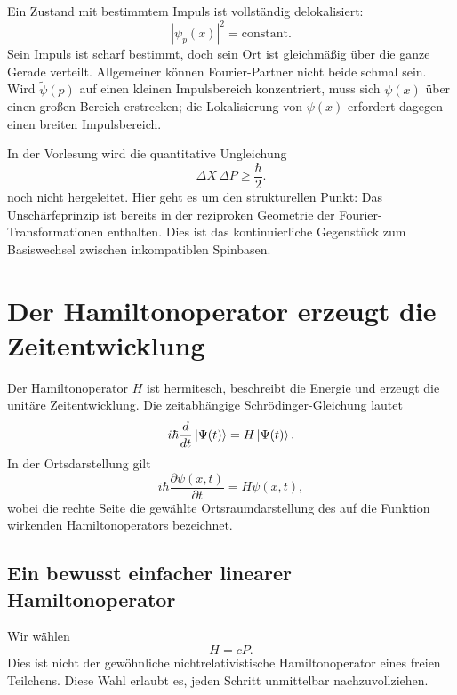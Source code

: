 Ein Zustand mit bestimmtem Impuls ist vollständig delokalisiert:
\begin{equation}
|\psi_p(x)|^2=\text{constant}.
\end{equation}
Sein Impuls ist scharf bestimmt, doch sein Ort ist gleichmäßig über die ganze Gerade verteilt. Allgemeiner können Fourier-Partner nicht beide schmal sein. Wird \(\widetilde{\psi}(p)\) auf einen kleinen Impulsbereich konzentriert, muss sich \(\psi(x)\) über einen großen Bereich erstrecken; die Lokalisierung von \(\psi(x)\) erfordert dagegen einen breiten Impulsbereich.

In der Vorlesung wird die quantitative Ungleichung
\begin{equation}
\Delta X\,\Delta P\geq\frac{\hbar}{2}.
\end{equation}
noch nicht hergeleitet. Hier geht es um den strukturellen Punkt: Das Unschärfeprinzip ist bereits in der reziproken Geometrie der Fourier-Transformationen enthalten. Dies ist das kontinuierliche Gegenstück zum Basiswechsel zwischen inkompatiblen Spinbasen.

\section{Der Hamiltonoperator erzeugt die Zeitentwicklung}

Der Hamiltonoperator \(H\) ist hermitesch, beschreibt die Energie und erzeugt die unitäre Zeitentwicklung. Die zeitabhängige Schr\"odinger-Gleichung lautet
\begin{equation}
i\hbar\frac{d}{dt}\left\lvert\Psi(t)\right\rangle
=
H\left\lvert\Psi(t)\right\rangle.
\label{eq:l9-abstract-schrodinger}
\end{equation}
In der Ortsdarstellung gilt
\begin{equation}
i\hbar\frac{\partial\psi(x,t)}{\partial t}
=
H\psi(x,t),
\label{eq:l9-position-schrodinger}
\end{equation}
wobei die rechte Seite die gewählte Ortsraumdarstellung des auf die Funktion wirkenden Hamiltonoperators bezeichnet.

\subsection{Ein bewusst einfacher linearer Hamiltonoperator}

Wir wählen
\begin{equation}
H=cP.
\label{eq:l9-linear-hamiltonian}
\end{equation}
Dies ist nicht der gewöhnliche nichtrelativistische Hamiltonoperator eines freien Teilchens. Diese Wahl erlaubt es, jeden Schritt unmittelbar nachzuvollziehen.

